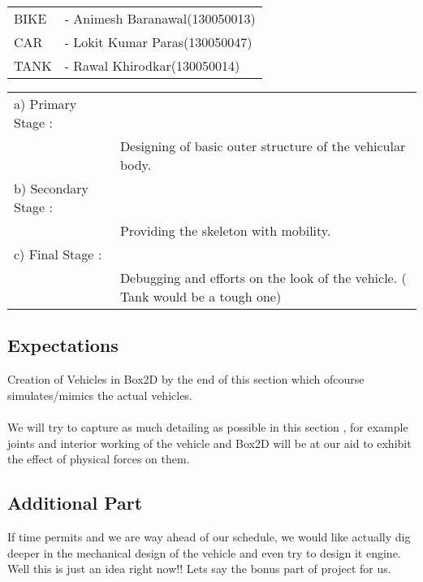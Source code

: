 \documentclass[a4paper,11pt]{article}
\begin{document}
\begin{center}
\begin{tabular}{l l}
BIKE  & - Animesh Baranawal(130050013) \\ 
CAR & - Lokit Kumar Paras(130050047) \\
TANK & - Rawal Khirodkar(130050014) \\
\end{tabular}
\end{center}
\begin{center}
\begin{tabular}{l l}
a) Primary Stage :  & \\ 
& Designing of basic outer structure of the vehicular body. \\
b) Secondary Stage :  & \\ 
& Providing the skeleton with mobility. \\
c) Final Stage :  & \\ 
& Debugging and efforts on the look of the vehicle. ( Tank would be a tough one) \\
\end{tabular}
\end{center}

\subsection{Expectations}

Creation of Vehicles in Box2D by the end of this section which ofcourse simulates/mimics the actual vehicles. \\
\\
We will try to capture as much detailing as possible in this section , for example joints and interior working of the vehicle and Box2D will be at our aid to exhibit the effect of physical forces on them. \\

\subsection{Additional Part}

If time permits and we are way ahead of our schedule, we would like actually dig deeper in the mechanical design of the vehicle and even try to design it engine. Well this is just an idea right now!!
Lets say the bonus part of project for us. 

\end{document}
